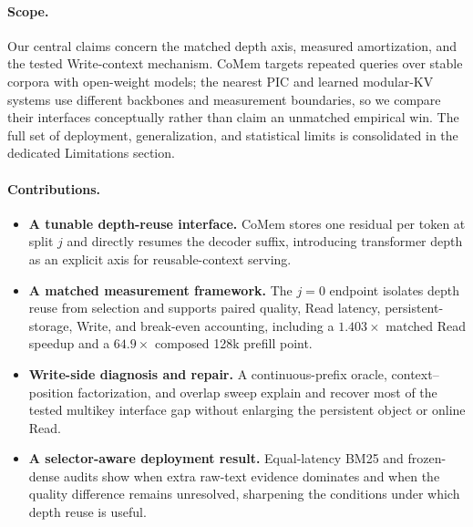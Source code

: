 \paragraph{Scope.}
Our central claims concern the matched depth axis, measured amortization, and
the tested Write-context mechanism. CoMem targets repeated queries over stable
corpora with open-weight models; the nearest PIC and learned modular-KV systems
use different backbones and measurement boundaries, so we compare their
interfaces conceptually rather than claim an unmatched empirical win. The full
set of deployment, generalization, and statistical limits is consolidated in
the dedicated Limitations section.

\paragraph{Contributions.}
\begin{itemize}[leftmargin=1.2em,itemsep=1pt,topsep=2pt]
\item \textbf{A tunable depth-reuse interface.} CoMem stores one residual per
token at split $j$ and directly resumes the decoder suffix, introducing
transformer depth as an explicit axis for reusable-context serving.
\item \textbf{A matched measurement framework.} The $j{=}0$ endpoint isolates
depth reuse from selection and supports paired quality, Read latency,
persistent-storage, Write, and break-even accounting, including a
$1.403\times$ matched Read speedup and a $64.9\times$ composed 128k prefill
point.
\item \textbf{Write-side diagnosis and repair.} A continuous-prefix oracle,
context--position factorization, and overlap sweep explain and recover most of
the tested multikey interface gap without enlarging the persistent object or
online Read.
\item \textbf{A selector-aware deployment result.} Equal-latency BM25 and
frozen-dense audits show when extra raw-text evidence dominates and when the
quality difference remains unresolved, sharpening the conditions under which
depth reuse is useful.
\end{itemize}
